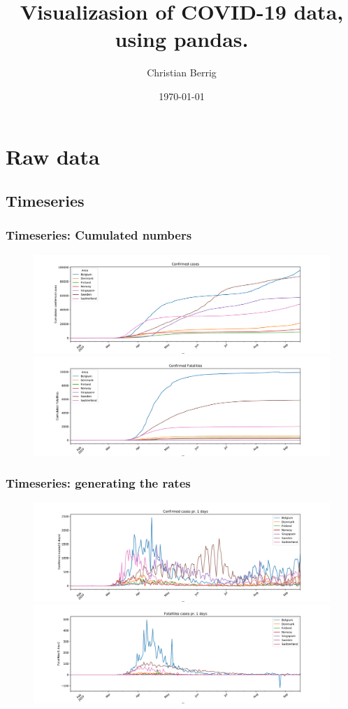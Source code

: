 \documentclass{beamer}
\title{Visualizasion of COVID-19 data, using pandas.}
\author{Christian Berrig}
\institute{Roskilde Univarsity}
\date{\today}
\begin{document}
\begin{frame}
\titlepage
\end{frame}

\section{Raw data}
\subsection{Timeseries}

\begin{frame}
\frametitle{Timeseries: Cumulated numbers}
\begin{figure}[H]
\includegraphics[width=\textwidth]{../figs/confirmed_timeseries_linear.pdf}
\includegraphics[width=\textwidth]{../figs/deaths_timeseries_linear.pdf}
\end{figure}
\end{frame}

\begin{frame}
\frametitle{Timeseries: generating the rates}
\begin{figure}[H]
\includegraphics[width=\textwidth]{../figs/confirmed_rate_timeseries_1days_linear.pdf}
\includegraphics[width=\textwidth]{../figs/deaths_rate_timeseries_1days_linear.pdf}
\end{figure}
\end{frame}
\end{document}
